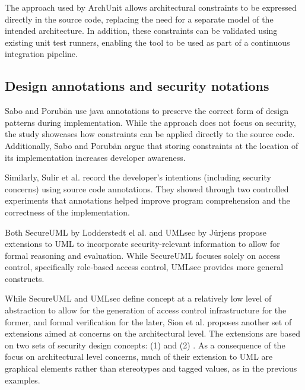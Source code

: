 The approach used by ArchUnit allows architectural constraints to be expressed directly in the source code, replacing the need for a separate model of the intended architecture. In addition, these constraints can be validated using existing unit test runners, enabling the tool to be used as part of a continuous integration pipeline.





\subsection{Design annotations and security notations}

Sabo and Porubän \cite{sabo_preserving_2009} use java annotations to preserve the correct form of design patterns during implementation. While the approach does not focus on security, the study showcases how constraints can be applied directly to the source code. Additionally, Sabo and Porubän argue that storing constraints at the location of its implementation increases developer awareness. 

Similarly, Sulir et al. \cite{sulir_recording_2016} record the developer's intentions (including security concerns) using source code annotations. They showed through two controlled experiments that annotations helped improve program comprehension and the correctness of the implementation.

Both SecureUML by Lodderstedt el al. \cite{goos_secureuml_2002} and UMLsec by Jürjens \cite{goos_umlsec_2002} propose extensions to UML to incorporate security-relevant information to allow for formal reasoning and evaluation. While SecureUML focuses solely on access control, specifically role-based access control, UMLsec provides more general constructs.

While SecureUML and UMLsec define concept at a relatively low level of abstraction to allow for the generation of access control infrastructure for the former, and formal verification for the later, Sion et al. \cite{sion_masc_2015} proposes another set of extensions aimed at concerns on the architectural level. The extensions are based on two sets of security design concepts: (1)  and (2) . As a consequence of the focus on architectural level concerns, much of their extension to UML are graphical elements rather than stereotypes and tagged values, as in the previous examples. 

